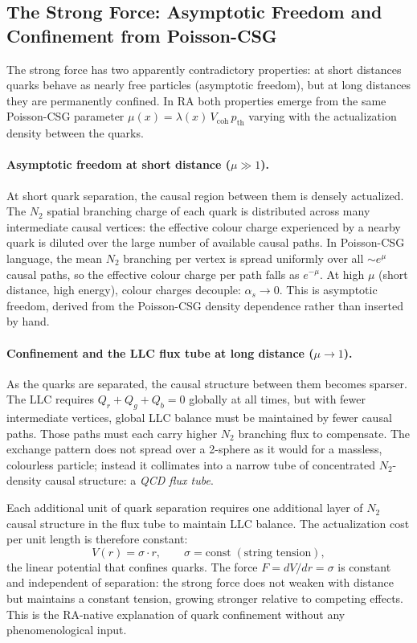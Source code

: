 \documentclass[11pt,a4paper]{article}
\begin{document}
\subsection{The Strong Force: Asymptotic Freedom and Confinement from Poisson-CSG}

The strong force has two apparently contradictory properties: at short
distances quarks behave as nearly free particles (asymptotic freedom), but
at long distances they are permanently confined. In RA both properties emerge
from the same Poisson-CSG parameter $\mu(x) = \lambda(x)\,V_\text{coh}\,p_\text{th}$
varying with the actualization density between the quarks.

\paragraph{Asymptotic freedom at short distance ($\mu \gg 1$).}
At short quark separation, the causal region between them is densely actualized.
The $N_2$ spatial branching charge of each quark is distributed across many
intermediate causal vertices: the effective colour charge experienced by a
nearby quark is diluted over the large number of available causal paths.
In Poisson-CSG language, the mean $N_2$ branching per vertex is spread
uniformly over all $\sim e^\mu$ causal paths, so the effective colour charge
per path falls as $e^{-\mu}$. At high $\mu$ (short distance, high energy),
colour charges decouple: $\alpha_s \to 0$. This is asymptotic freedom,
derived from the Poisson-CSG density dependence rather than inserted by hand.

\paragraph{Confinement and the LLC flux tube at long distance ($\mu \to 1$).}
As the quarks are separated, the causal structure between them becomes sparser.
The LLC requires $Q_r + Q_g + Q_b = 0$ globally at all times, but with fewer
intermediate vertices, global LLC balance must be maintained by fewer causal
paths. Those paths must each carry higher $N_2$ branching flux to compensate.
The exchange pattern does not spread over a 2-sphere as it would for a massless,
colourless particle; instead it collimates into a narrow tube of concentrated
$N_2$-density causal structure: a \emph{QCD flux tube}.

Each additional unit of quark separation requires one additional layer of
$N_2$ causal structure in the flux tube to maintain LLC balance. The
actualization cost per unit length is therefore constant:
\begin{equation}
  V(r) = \sigma \cdot r,
  \qquad \sigma = \text{const} \;(\text{string tension}),
  \label{eq:linear_potential}
\end{equation}
the linear potential that confines quarks. The force
$F = dV/dr = \sigma$ is constant and independent of separation: the strong
force does not weaken with distance but maintains a constant tension,
growing stronger relative to competing effects. This is the RA-native
explanation of quark confinement without any phenomenological input.
\end{document}
